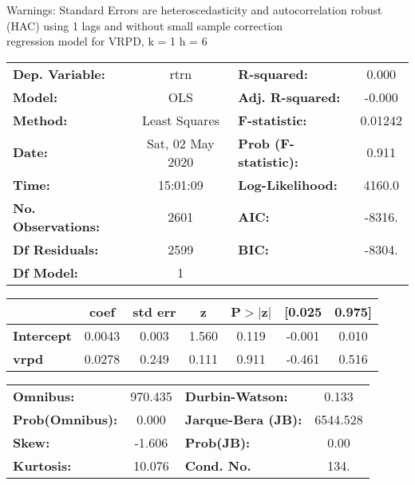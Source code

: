 Warnings: \newline
 [1] Standard Errors are heteroscedasticity and autocorrelation robust (HAC) using 1 lags and without small sample correction\\ 

regression model for VRPD, k = 1 h = 6\begin{center}
\begin{tabular}{lclc}
\toprule
\textbf{Dep. Variable:}    &       rtrn       & \textbf{  R-squared:         } &     0.000   \\
\textbf{Model:}            &       OLS        & \textbf{  Adj. R-squared:    } &    -0.000   \\
\textbf{Method:}           &  Least Squares   & \textbf{  F-statistic:       } &   0.01242   \\
\textbf{Date:}             & Sat, 02 May 2020 & \textbf{  Prob (F-statistic):} &    0.911    \\
\textbf{Time:}             &     15:01:09     & \textbf{  Log-Likelihood:    } &    4160.0   \\
\textbf{No. Observations:} &        2601      & \textbf{  AIC:               } &    -8316.   \\
\textbf{Df Residuals:}     &        2599      & \textbf{  BIC:               } &    -8304.   \\
\textbf{Df Model:}         &           1      & \textbf{                     } &             \\
\bottomrule
\end{tabular}
\begin{tabular}{lcccccc}
                   & \textbf{coef} & \textbf{std err} & \textbf{z} & \textbf{P$> |$z$|$} & \textbf{[0.025} & \textbf{0.975]}  \\
\midrule
\textbf{Intercept} &       0.0043  &        0.003     &     1.560  &         0.119        &       -0.001    &        0.010     \\
\textbf{vrpd}      &       0.0278  &        0.249     &     0.111  &         0.911        &       -0.461    &        0.516     \\
\bottomrule
\end{tabular}
\begin{tabular}{lclc}
\textbf{Omnibus:}       & 970.435 & \textbf{  Durbin-Watson:     } &    0.133  \\
\textbf{Prob(Omnibus):} &   0.000 & \textbf{  Jarque-Bera (JB):  } & 6544.528  \\
\textbf{Skew:}          &  -1.606 & \textbf{  Prob(JB):          } &     0.00  \\
\textbf{Kurtosis:}      &  10.076 & \textbf{  Cond. No.          } &     134.  \\
\bottomrule
\end{tabular}
\end{center}

